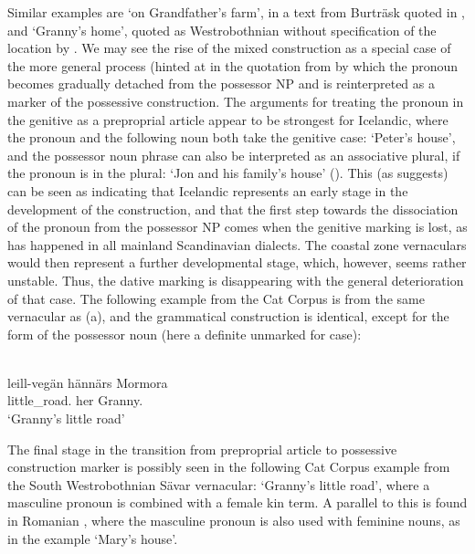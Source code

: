 Similar examples are  ‘on Grandfather’s farm’, in a text from Burträsk quoted in \citet[104]{Wessén1966}, and  ‘Granny’s home’, quoted as Westrobothnian without specification of the location by \citet[131]{Larsson1929}. We may see the rise of the mixed construction as a special case of the more general process (hinted at in the quotation from \citet{KoptjevskajaTamm2003} by which the pronoun becomes gradually detached from the possessor NP and is reinterpreted as a marker of the possessive construction. The arguments for treating the pronoun in the genitive as a preproprial article appear to be strongest for Icelandic, where the pronoun and the following noun both take the genitive case: ‘Peter’s house’, and the possessor noun phrase can also be interpreted as an associative plural, if the pronoun is in the plural:  ‘Jon and his family’s house’ (\citet[69]{Delsing2003b}). This (as \citealt[632]{KoptjevskajaTamm2003} suggests) can be seen as indicating that Icelandic represents an early stage in the development of the construction, and that the first step towards the dissociation of the pronoun from the possessor NP comes when the genitive marking is lost, as has happened in all mainland Scandinavian dialects. The coastal zone vernaculars would then represent a further developmental stage, which, however, seems rather unstable. Thus, the dative marking is disappearing with the general deterioration of that case. The following example from the Cat Corpus is from the same vernacular as (a), and the grammatical construction is identical, except for the form of the possessor noun (here a definite unmarked for case): 

\ea\label{}
\\
\gll leill-vegän  hännärs  Mormora\\
little\_road.{}  her  Granny.{}\\
\glt ‘Granny’s little road’
\z

 The final stage in the transition from preproprial article to possessive construction marker is possibly seen in the following Cat Corpus example from the South Westrobothnian Sävar vernacular: ‘Granny’s little road’, where a masculine pronoun is combined with a female kin term. A parallel to this is found in Romanian \citep[632]{KoptjevskajaTamm2003}, where the masculine pronoun  is also used with feminine nouns, as in the example  ‘Mary’s house’.

